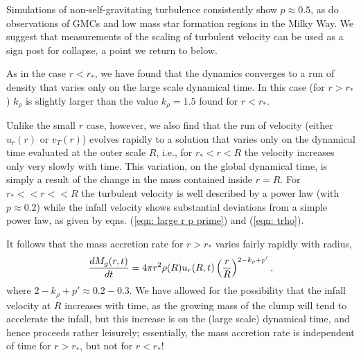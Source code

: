 \documentclass[iop,apj,numberedappendix]{emulateapj}
\newcommand       \be		{\begin{equation}}
\newcommand       \ee		{\end{equation}}
\begin{document}
Simulations of non-self-gravitating turbulence consistently show
$p\approx0.5$, as do observations of GMCs
\citep{1981MNRAS.194..809L,2004ApJ...615L..45H} and low mass star
formation regions \citep{1983ApJ...270..105M, 1992A&A...257..715F} in
the Milky Way. We suggest that measurements of the scaling of
turbulent velocity can be used as a sign post for collapse, a point we
return to below.

As in the case $r<r_*$, we have found that the dynamics converges to a
run of density that varies only on the large scale dynamical time. In
this case (for $r>r_*$) $k_\rho$ is slightly larger than the value
$k_\rho=1.5$ found for $r<r_*$.

Unlike the small $r$ case, however, we also find that the run of
velocity (either $u_r(r)$ or $v_T(r)$) evolves rapidly to a solution
that varies only on the dynamical time evaluated at the outer scale
$R$, i.e., for $r_*<r<R$ the velocity increases only very slowly with
time. This variation, on the global dynamical time, is simply a result of
the change in the mass contained inside $r=R$. For $r_*<<r<<R$ the
turbulent velocity is well described by a power law (with
$p\approx0.2$) while the infall velocity shows substantial deviations
from a simple power law, as given by eqns. (\ref{eqn: large r p
  prime}) and (\ref{eqn: trho}).

It follows that the mass accretion rate for $r>r_*$ varies fairly rapidly
with radius,
%
\be  \label{eqn: larger r mdot}%
{dM_g(r,t)\over dt}=4\pi r^2\rho(R)u_r(R,t)\left({r\over R}\right)^{2-k_\rho+p'},
\ee  %
%
where $2-k_\rho+p'\approx 0.2-0.3$. We have allowed
for the possibility that the infall velocity at $R$ increases with
time, as the growing mass of the clump will tend to accelerate the
infall, but this increase is on the (large scale) dynamical time, and
hence proceeds rather leisurely; essentially, the mass accretion rate
is independent of time for $r>r_*$, but not for $r<r_*$!
\end{document}
